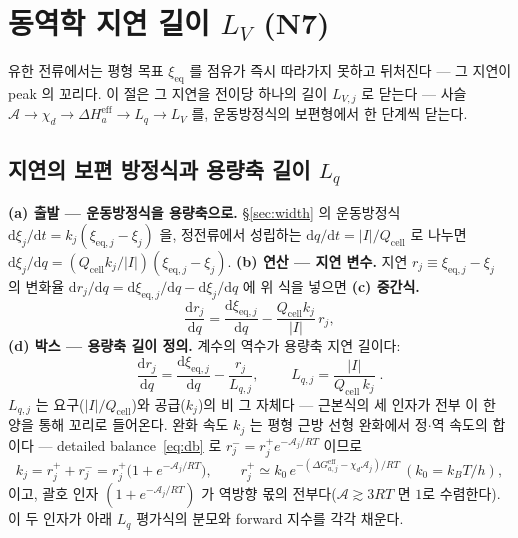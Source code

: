 \documentclass[11pt,a4paper]{article}
\newcommand{\dd}{\mathrm{d}}
\newcommand{\eff}{\mathrm{eff}}
\newcommand{\eq}{\mathrm{eq}}
\newcommand{\cell}{\mathrm{cell}}
\begin{document}
\section{동역학 지연 길이 $L_V$ (N7)}\label{sec:lag}
유한 전류에서는 평형 목표 $\xi_\eq$ 를 점유가 즉시 따라가지 못하고 뒤처진다 — 그 지연이 peak 의 꼬리다. 이 절은 그 지연을 전이당 하나의 길이 $L_{V,j}$ 로 닫는다 — 사슬
$\mathcal A\to\chi_d\to\Delta H_a^\eff\to L_q\to L_V$ 를, 운동방정식의 보편형에서 한 단계씩 닫는다.

\subsection{지연의 보편 방정식과 용량축 길이 $L_q$}
\textbf{(a) 출발 — 운동방정식을 용량축으로.} \S\ref{sec:width} 의 운동방정식 $\dd\xi_j/\dd t=k_j(\xi_{\eq,j}-\xi_j)$
을, 정전류에서 성립하는 $\dd q/\dd t=|I|/Q_\cell$ 로 나누면 $\dd\xi_j/\dd q=(Q_\cell k_j/|I|)(\xi_{\eq,j}-\xi_j)$.
\textbf{(b) 연산 — 지연 변수.} 지연 $r_j\equiv\xi_{\eq,j}-\xi_j$ 의 변화율 $\dd r_j/\dd q=\dd\xi_{\eq,j}/\dd q-\dd\xi_j/\dd q$
에 위 식을 넣으면 \textbf{(c) 중간식.}
\begin{equation}
\frac{\dd r_j}{\dd q}=\frac{\dd\xi_{\eq,j}}{\dd q}-\frac{Q_\cell k_j}{|I|}\,r_j,
\label{eq:Lqmid}
\end{equation}
\textbf{(d) 박스 — 용량축 길이 정의.} 계수의 역수가 용량축 지연 길이다:
\begin{equation}
\frac{\dd r_j}{\dd q}=\frac{\dd\xi_{\eq,j}}{\dd q}-\frac{r_j}{L_{q,j}},
\qquad \boxed{\;L_{q,j}=\frac{|I|}{Q_\cell\,k_j}\;.}
\label{eq:Lq}
\end{equation}
$L_{q,j}$ 는 요구($|I|/Q_\cell$)와 공급($k_j$)의 비 그 자체다 — 근본식의 세 인자가 전부 이 한 양을 통해 꼬리로
들어온다. 완화 속도 $k_j$ 는 평형 근방 선형 완화에서 정$\cdot$역 속도의 합이다 — detailed balance~\eqref{eq:db} 로
$r_j^-=r_j^+e^{-\mathcal A_j/RT}$ 이므로
\begin{equation}
k_j=r_j^++r_j^-=r_j^+\big(1+e^{-\mathcal A_j/RT}\big),
\qquad r_j^+\simeq k_0\,e^{-(\Delta G_{a,j}^\eff-\chi_d\mathcal A_j)/RT}\ (k_0=k_BT/h),
\label{eq:kuniv}
\end{equation}
이고, 괄호 인자 $(1+e^{-\mathcal A_j/RT})$ 가 역방향 몫의 전부다($\mathcal A\gtrsim3RT$ 면 $1$로 수렴한다). 이 두 인자가
아래 $L_q$ 평가식의 분모와 forward 지수를 각각 채운다.
\end{document}
